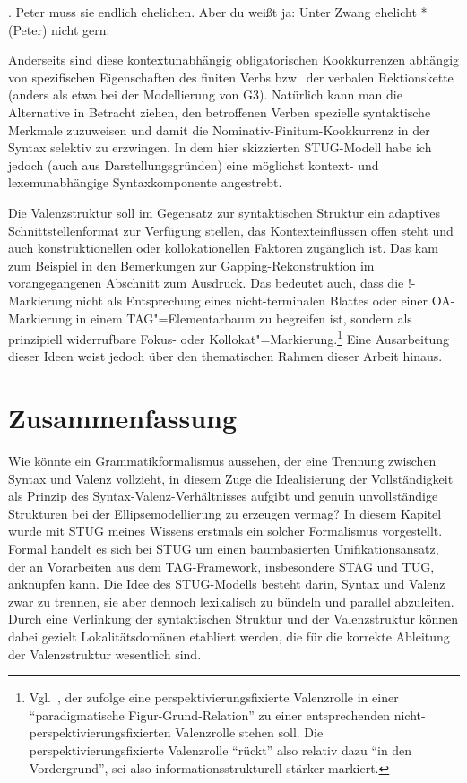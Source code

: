 {\ex. Peter muss sie endlich ehelichen. Aber du wei\ss t ja: Unter Zwang ehelicht *(Peter) nicht gern.

Anderseits sind diese kontextunabhängig obligatorischen Kookkurrenzen abhängig von spezifischen Eigenschaften des finiten Verbs bzw.\ der verbalen Rektionskette (anders als etwa bei der Modellierung von G3). Natürlich kann man die Alternative in Betracht ziehen, den betroffenen Verben spezielle syntaktische Merkmale zuzuweisen und damit die Nominativ-Finitum-Kookkurrenz in der Syntax selektiv zu erzwingen. In dem hier skizzierten STUG-Modell habe ich jedoch (auch aus Darstellungsgründen) eine möglichst kontext- und lexemunabhängige Syntaxkomponente angestrebt. 

Die Valenzstruktur soll im Gegensatz zur syntaktischen Struktur ein adaptives Schnittstellenformat zur Verfügung stellen, das Kontexteinflüssen offen steht und auch konstruktionellen oder kollokationellen Faktoren zugänglich ist. Das kam zum Beispiel in den Bemerkungen zur Gapping-Rekonstruktion im vorangegangenen Abschnitt zum Ausdruck. Das bedeutet auch, dass die !-Markierung nicht als Entsprechung eines nicht-terminalen Blattes oder einer OA-Markierung in einem TAG"=Elementarbaum zu begreifen ist, sondern als prinzipiell widerrufbare Fokus- oder Kollokat"=Markierung.\footnote{Vgl.\ \citet[265]{Duerscheid:99}, der zufolge eine perspektivierungsfixierte Valenzrolle in einer "`paradigmatische Figur-Grund-Relation"' zu einer entsprechenden nicht-perspektivierungsfixierten Valenzrolle stehen soll. Die perspektivierungsfixierte Valenzrolle "`rückt"' also relativ dazu "`in den Vordergrund"', sei also informationsstrukturell stärker markiert.} Eine Ausarbeitung dieser Ideen weist jedoch über den thematischen Rahmen dieser Arbeit hinaus.




\section{Zusammenfassung}

Wie könnte ein Grammatikformalismus aussehen, der eine Trennung zwischen Syntax und Valenz vollzieht, in diesem Zuge die Idealisierung der Vollständigkeit als Prinzip des Syntax-Valenz-Verhältnisses aufgibt und genuin unvollständige Strukturen bei der Ellipsemodellierung zu erzeugen vermag? In diesem Kapitel wurde mit STUG meines Wissens erstmals ein solcher Formalismus vorgestellt. Formal handelt es sich bei STUG um einen baumbasierten Unifikationsansatz, der an Vorarbeiten aus dem TAG-Framework, insbesondere STAG und TUG, anknüpfen kann. Die Idee des STUG-Modells besteht darin, Syntax und Valenz zwar zu trennen, sie aber dennoch lexikalisch zu bündeln und parallel abzuleiten. Durch eine Verlinkung der syntaktischen Struktur und der Valenzstruktur können dabei gezielt Lokalitätsdomänen etabliert werden, die für die korrekte Ableitung der Valenzstruktur wesentlich sind.  

}

